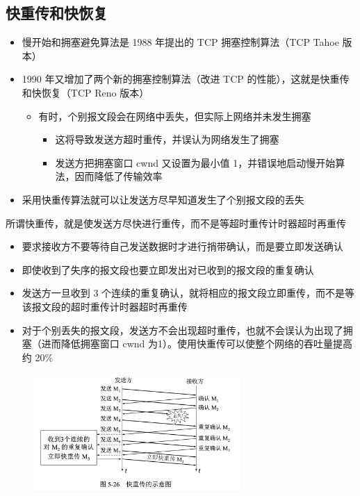 \documentclass[cs4size,a4paper,10pt]{ctexart}
\begin{document}
	\subsection{快重传和快恢复}
	\begin{itemize}
		\item 慢开始和拥塞避免算法是 1988 年提出的 TCP 拥塞控制算法（TCP Tahoe 版本）
		\item 1990 年又增加了两个新的拥塞控制算法（改进 TCP 的性能），这就是快重传和快恢复（TCP Reno 版本）
		\begin{itemize}
			\item 有时，个别报文段会在网络中丢失，但实际上网络并未发生拥塞
			\begin{itemize}
				\item 这将导致发送方超时重传，并误认为网络发生了拥塞
				\item 发送方把拥塞窗口 cwnd 又设置为最小值 1，并错误地启动慢开始算法，因而降低了传输效率
			\end{itemize}
		\end{itemize}
		\item 采用快重传算法就可以让发送方尽早知道发生了个别报文段的丢失
	\end{itemize}

	所谓快重传，就是使发送方尽快进行重传，而不是等超时重传计时器超时再重传
	\begin{itemize}
		\item 要求接收方不要等待自己发送数据时才进行捎带确认，而是要立即发送确认
		\item 即使收到了失序的报文段也要立即发出对已收到的报文段的重复确认
		\item 发送方一旦收到 3 个连续的重复确认，就将相应的报文段立即重传，而不是等该报文段的超时重传计时器超时再重传
		\item 对于个别丢失的报文段，发送方不会出现超时重传，也就不会误认为出现了拥塞（进而降低拥塞窗口 cwnd 为1）。使用快重传可以使整个网络的吞吐量提高约 20\%
	\end{itemize}

	\begin{figure}[H]
		\centering
		\includegraphics[width=0.7\textwidth]{img/5.26}
	\end{figure}
\end{document}
